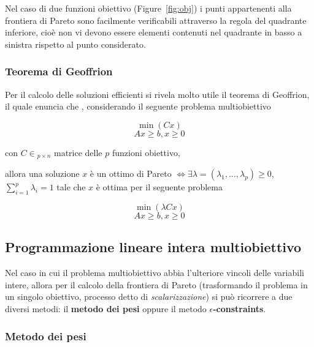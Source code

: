 Nel caso di due funzioni obiettivo (Figure~\ref{fig:obj}) i punti appartenenti 
alla frontiera di Pareto sono facilmente verificabili attraverso la regola del quadrante
inferiore, cioè non vi devono essere elementi contenuti nel quadrante in basso a sinistra 
rispetto al punto considerato.

\subsubsection{Teorema di Geoffrion}
\label{section:geoffrion}

Per il calcolo delle soluzioni efficienti si rivela molto utile il teorema di Geoffrion, il
quale enuncia che \cite{Figueira2006}, considerando il seguente problema multiobiettivo

\begin{equation*}
    \min (Cx)    
    \label{eq:}
\end{equation*}
\begin{equation}
    Ax \geq b, x \geq 0
    \label{eq:multi_problem}
\end{equation}

\noindent
con $C \in $\Rset$_{p \times n}$ matrice delle $p$ funzioni obiettivo,

allora una soluzione $x$ è un ottimo di Pareto $\iff \exists \lambda = (\lambda_1, \dots, 
\lambda_p) \geq 0$, $\sum_{i=1}^{p} \lambda_i = 1$ tale che $x$ è ottima per il seguente 
problema

\begin{equation*}
    \min (\lambda Cx)    
    \label{eq:}
\end{equation*}
\begin{equation*}
    Ax \geq b, x \geq 0
    \label{eq:}
\end{equation*}

\subsection{Programmazione lineare intera multiobiettivo}
\label{section:plimo}

Nel caso in cui il problema multiobiettivo abbia l'ulteriore vincoli delle variabili intere,
allora per il calcolo della frontiera di Pareto (trasformando il problema in un singolo 
obiettivo, processo detto di \textit{scalarizzazione}) si può ricorrere a due diversi metodi: 
il \textbf{metodo dei pesi} oppure il metodo \textbf{$\epsilon$-constraints}. 

\subsubsection{Metodo dei pesi}
\label{section:weight_method}


